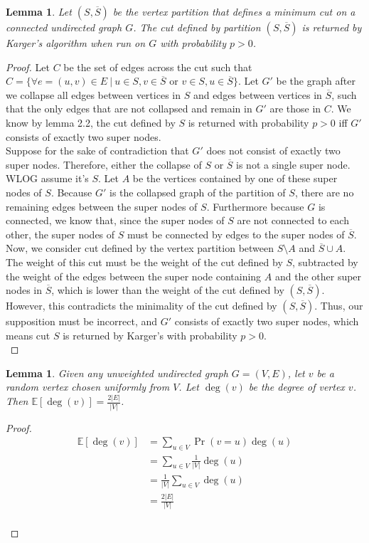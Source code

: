 \documentclass[psamsfonts, 10pt]{amsart}
\newtheorem{lem}[thm]{Lemma}
\theoremstyle{definition}
\theoremstyle{remark}
\numberwithin{equation}{section}
\newcommand{\E}{\mathbb{E}}
\newcommand{\tor}{\text{ or } }
\newcommand{\creturn}{\mbox{}\\}
\begin{document}
\begin{lem}
Let $(S, \overline{S})$ be the vertex partition that defines a minimum cut on a connected undirected graph $G$. The cut defined by partition $(S, \overline{S})$ is returned by Karger's algorithm when run on $G$ with probability $p > 0$.
\end{lem}
\begin{proof}
Let $C$ be the set of edges across the cut such that $C = \{ \forall e = (u,v) \in E \  \lvert \ u \in S, v \in \overline{S} \tor v \in S, u \in \overline{S} \}$. Let $G'$ be the graph after we collapse all edges between vertices in $S$ and edges between vertices in $\overline{S}$, such that the only edges that are not collapsed and remain in $G'$ are those in $C$. We know by lemma 2.2, the cut defined by $S$ is returned with probability $p > 0$ iff $G'$ consists of exactly two super nodes.\\

Suppose for the sake of contradiction that $G'$ does not consist of exactly two super nodes. Therefore, either the collapse of $S$ or $\overline{S}$ is not a single super node. WLOG assume it's $S$. Let $A$ be the vertices contained by one of these super nodes of $S$. Because $G'$ is the collapsed graph of the partition of $S$, there are no remaining edges between the super nodes of $S$. Furthermore because $G$ is connected, we know that, since the super nodes of $S$ are not connected to each other, the super nodes of $S$ must be connected by edges to the super nodes of $\overline{S}$. Now, we consider cut defined by the vertex partition between $S \setminus A$ and $\overline{S} \cup A$. The weight of this cut must be the weight of the cut defined by $S$, subtracted by the weight of the edges between the super node containing $A$ and the other super nodes in $\overline{S}$, which is lower than the weight of the cut defined by $(S, \overline{S})$. However, this contradicts the minimality of the cut defined by $(S, \overline{S})$. Thus, our supposition must be incorrect, and $G'$ consists of exactly two super nodes, which means cut $S$ is returned by Karger's with probability $p > 0$.
\\
\end{proof}

\begin{lem}
Given any unweighted undirected graph $G = (V,E)$, let $v$ be a random vertex chosen uniformly from $V$. Let $\deg(v)$ be the degree of vertex $v$. Then $\E[\deg(v)] = \frac{2 \lvert E \rvert }{\rvert V \lvert}$.
\end{lem}
\begin{proof}
\begin{equation}\begin{aligned}
\E[\deg(v)] &= \sum_{u \in V} \Pr(v = u)\deg(u)\\
&= \sum_{u \in V} \frac{1}{\lvert V \rvert}\deg(u)\\
&= \frac{1}{\lvert V \rvert} \sum_{u \in V} \deg(u)\\
&= \frac{2 \lvert E \rvert}{\lvert V \rvert}
\end{aligned}
\end{equation}
\creturn
\end{proof}
\end{document}
